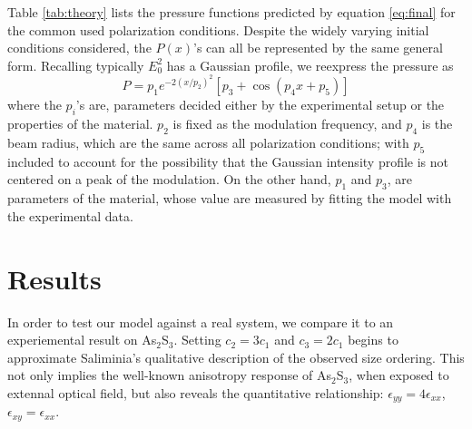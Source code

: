 \documentclass[aps, prl, twocolumn, groupedaddress]{revtex4-1}
\begin{document}
Table \ref{tab:theory} lists the pressure functions predicted by
equation \ref{eq:final} for the common used polarization
conditions. Despite the widely varying initial conditions considered,
the $P(x)$'s can all be represented by the same general
form. Recalling typically $E_0^2$ has a Gaussian profile, we reexpress
the pressure as
\begin{equation}
  P = p_1 e^{-2\left(x/p_2\right)^2}\left[p_3+\cos\left( p_4 x +p_5\right)\right]
  \label{eq:presmod}
\end{equation}
where the $p_i$'s are, parameters decided either by the experimental
setup or the properties of the material. $p_2$ is fixed as the
modulation frequency, and $p_4$ is the beam radius, which are the same
across all polarization conditions; with $p_5$ included to account for
the possibility that the Gaussian intensity profile is not centered on
a peak of the modulation.  On the other hand, $p_1$ and $p_3$, are
parameters of the material, whose value are measured by fitting the
model with the experimental data.


\section{Results}
In order to test our model against a real system, we compare it to an
experiemental result on As$_2$S$_3$\cite{saliminia}. Setting $c_2 =
3c_1$ and $c_3 = 2c_1$ begins to approximate Saliminia's qualitative
description of the observed size ordering. This not only implies the
well-known anisotropy response of As$_2$S$_3$, when exposed to
extennal optical field, but also reveals the quantitative
relationship: $\epsilon_{yy} = 4\epsilon_{xx}$, $\epsilon_{xy} =
\epsilon_{xx}$.
\end{document}
